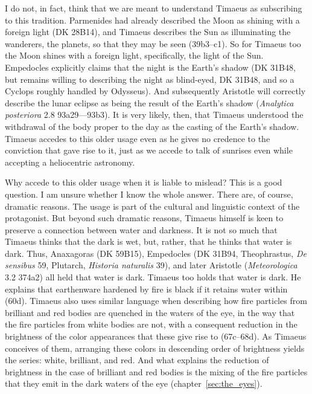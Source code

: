 I do not, in fact, think that we are meant to understand Timaeus as subscribing to this tradition. Parmenides had already described the Moon as shining with a foreign light (DK 28B14), and Timaeus describes the Sun as illuminating the wanderers, the planets, so that they may be seen (39b3--c1). So for Timaeus too the Moon shines with a foreign light, specifically, the light of the Sun. Empedocles explicitly claims that the night is the Earth's shadow (DK 31B48, but remains willing to describing the night as blind-eyed, DK 31B48, and so a Cyclops roughly handled by Odysseus). And subsequently Aristotle will correctly describe the lunar eclipse as being the result of the Earth's shadow (\emph{Analytica posteriora} 2.8 93a29—93b3). It is very likely, then, that Timaeus understood the withdrawal of the body proper to the day as the casting of the Earth's shadow. Timaeus accedes to this older usage even as he gives no credence to the conviction that gave rise to it, just as we accede to talk of sunrises even while accepting a heliocentric astronomy. 

Why accede to this older usage when it is liable to mislead? This is a good question. I am unsure whether I know the whole answer. There are, of course, dramatic reasons. The usage is part of the cultural and linguistic context of the protagonist. But beyond such dramatic reasons, Timaeus himself is keen to preserve a connection between water and darkness. It is not so much that Timaeus thinks that the dark is wet, but, rather, that he thinks that water is dark. Thus, Anaxagoras (DK 59B15), Empedocles (DK 31B94, Theophrastus, \emph{De sensibus} 59, Plutarch, \emph{Historia naturalis} 39), and later Aristotle (\emph{Meteorologica} 3.2 374a2) all held that water is dark. Timaeus too holds that water is dark. He explains that earthenware hardened by fire is black if it retains water within (60d). Timaeus also uses similar language when describing how fire particles from brilliant and red bodies are quenched in the waters of the eye, in the way that the fire particles from white bodies are not, with a consequent reduction in the brightness of the color appearances that these give rise to (67c–68d). As Timaeus conceives of them, arranging these colors in descending order of brightness yields the series: white, brilliant, and red. And what explains the reduction of brightness in the case of brilliant and red bodies is the mixing of the fire particles that they emit in the dark waters of the eye (chapter~\ref{sec:the_eyes}). 


